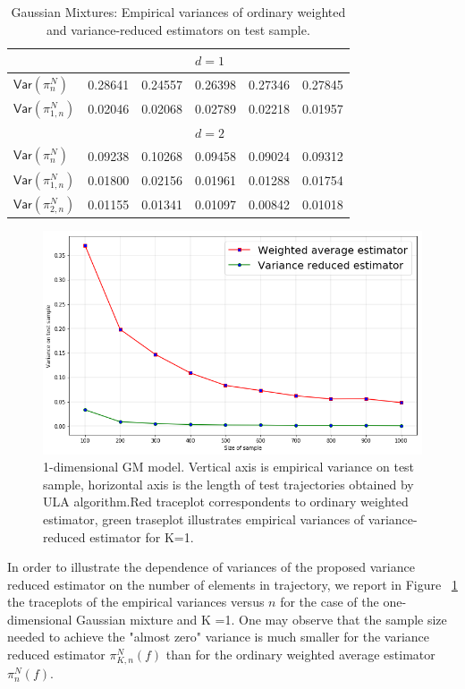 \documentclass[article]{elsarticle}
\begin{document}
\begin{table}[h]
\begin{tabular}{|l|lllll|}	
\hline
 &  &  &\(d = 1\)  &  &  \\ \hline
$\mathsf{Var}(\pi_n^N)$ &  0.28641 & 0.24557  &0.26398   &  0.27346 & 0.27845  \\
$\mathsf{Var}(\pi_{1,n}^N)$ & 0.02046 &  0.02068 & 0.02789 & 0.02218 &  0.01957\\ \hline
 &  &  &\(d = 2\)  &  &  \\ \hline
 $\mathsf{Var}(\pi_n^N)$     & 0.09238 & 0.10268 & 0.09458 &  0.09024 &  0.09312\\
 $\mathsf{Var}(\pi_{1,n}^N)$ & 0.01800 & 0.02156 & 0.01961 &  0.01288 &  0.01754\\
 $\mathsf{Var}(\pi_{2,n}^N)$ & 0.01155 & 0.01341 & 0.01097 &  0.00842 &  0.01018 \\ \hline
\end{tabular}
\caption{Gaussian Mixtures: Empirical variances of ordinary weighted and variance-reduced estimators on test sample.}
\label{table:gm}
\end{table}

\begin{figure}[h]
\begin{center}
\includegraphics[height=0.5\textwidth]{pictures/comparison_gm.png}
\caption{\label{fig:comparison}1-dimensional GM model. Vertical axis is empirical variance on test sample, horizontal axis is the length of test trajectories obtained by ULA algorithm.Red traceplot correspondents to ordinary weighted estimator, green traseplot illustrates empirical variances of variance-reduced estimator for K=1.}
\end{center}
\end{figure}
In order to illustrate the dependence of variances of the proposed variance reduced estimator on  the  number of elements in trajectory,  we report in Figure ~\ref{fig:comparison}  the traceplots of the empirical variances versus $n$ for the case of the one-dimensional Gaussian mixture and K =1. One may observe that the sample size needed to achieve the "almost zero" variance  is much smaller for the variance reduced estimator \(\pi_{K,n}^N(f)\) than for the ordinary weighted average estimator \(\pi_{n}^N(f)\).
\end{document}
